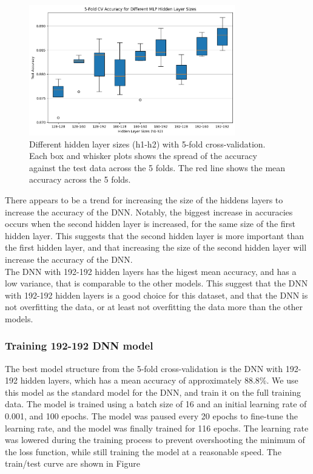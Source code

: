\documentclass[12pt]{article}
\begin{document}
\begin{figure}[H]
\centering
\includegraphics[width=0.8\textwidth]{figures/dnn_crossval.png}
\caption{Different hidden layer sizes (h1-h2) with 5-fold cross-validation. Each box and whisker plots shows the spread of the accuracy against the test data across the 5 folds. The red line shows the mean accuracy across the 5 folds.}
\label{fig:dnn_training}
\end{figure}

There appears to be a trend for increasing the size of the hiddens layers to increase the accuracy of the DNN. Notably, the biggest increase in accuracies occurs when the second hidden layer is increased, for the same size of the first hidden layer. This suggests that the second hidden layer is more important than the first hidden layer, and that increasing the size of the second hidden layer will increase the accuracy of the DNN.
\\
The DNN with 192-192 hidden layers has the higest mean accuracy, and has a low variance, that is comparable to the other models. This suggest that the DNN with 192-192 hidden layers is a good choice for this dataset, and that the DNN is not overfitting the data, or at least not overfitting the data more than the other models.

\subsubsection{Training 192-192 DNN model}
The best model structure from the 5-fold cross-validation is the DNN with 192-192 hidden layers, which has a mean accuracy of approximately 88.8\%. We use this model as the standard model for the DNN, and train it on the full training data. The model is trained using a batch size of 16 and an initial learning rate of 0.001, and 100 epochs. The model was paused every 20 epochs to fine-tune the learning rate, and the model was finally trained for 116 epochs. The learning rate was lowered during the training process to prevent overshooting the minimum of the loss function, while still training the model at a reasonable speed. The train/test curve are shown in Figure %
\end{document}
